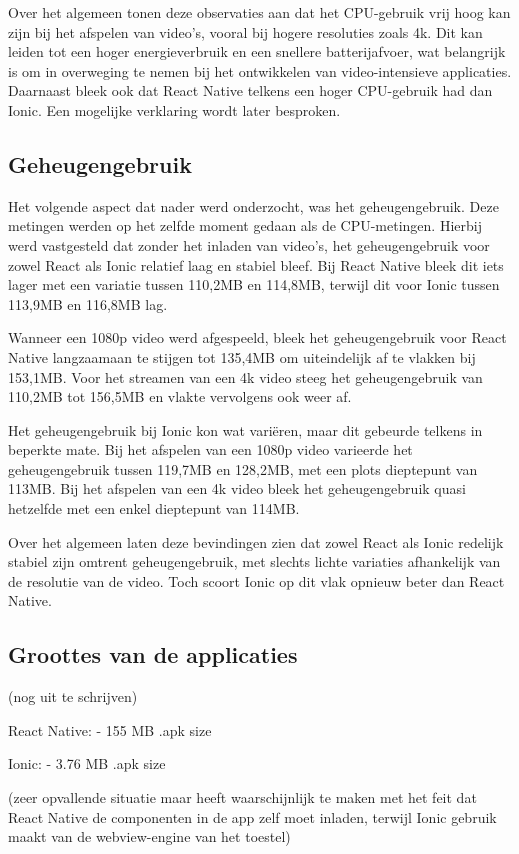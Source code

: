 Over het algemeen tonen deze observaties aan dat het CPU-gebruik vrij hoog kan zijn bij het afspelen van video's, vooral bij hogere resoluties zoals 4k. Dit kan leiden tot een hoger energieverbruik en een snellere batterijafvoer, wat belangrijk is om in overweging te nemen bij het ontwikkelen van video-intensieve applicaties. Daarnaast bleek ook dat React Native telkens een hoger CPU-gebruik had dan Ionic. Een mogelijke verklaring wordt later besproken.

\subsection{Geheugengebruik}
\label{subsec:geheugengebruik}

Het volgende aspect dat nader werd onderzocht, was het geheugengebruik. Deze metingen werden op het zelfde moment gedaan als de CPU-metingen. Hierbij werd vastgesteld dat zonder het inladen van video's, het geheugengebruik voor zowel React als Ionic relatief laag en stabiel bleef. Bij React Native bleek dit iets lager met een variatie tussen 110,2MB en 114,8MB, terwijl dit voor Ionic tussen 113,9MB en 116,8MB lag.

Wanneer een 1080p video werd afgespeeld, bleek het geheugengebruik voor React Native langzaamaan te stijgen tot 135,4MB om uiteindelijk af te vlakken bij 153,1MB. Voor het streamen van een 4k video steeg het geheugengebruik van 110,2MB tot 156,5MB en vlakte vervolgens ook weer af.

Het geheugengebruik bij Ionic kon wat variëren, maar dit gebeurde telkens in beperkte mate. Bij het afspelen van een 1080p video varieerde het geheugengebruik tussen 119,7MB en 128,2MB, met een plots dieptepunt van 113MB. Bij het afspelen van een 4k video bleek het geheugengebruik quasi hetzelfde met een enkel dieptepunt van 114MB.

Over het algemeen laten deze bevindingen zien dat zowel React als Ionic redelijk stabiel zijn omtrent geheugengebruik, met slechts lichte variaties afhankelijk van de resolutie van de video. Toch scoort Ionic op dit vlak opnieuw beter dan React Native.


\subsection{Groottes van de applicaties}
\label{subsec:groottes-van-de-applicaties}

(nog uit te schrijven)

React Native:
  - 155 MB .apk size

Ionic: 
  - 3.76 MB .apk size

(zeer opvallende situatie maar heeft waarschijnlijk te maken met het feit dat React Native de componenten in de app zelf moet inladen, terwijl Ionic gebruik maakt van de webview-engine van het toestel)